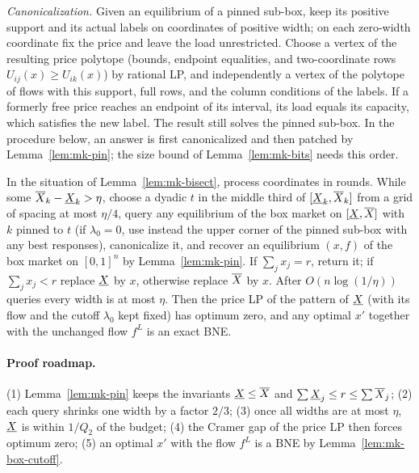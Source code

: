 \emph{Canonicalization.} Given an equilibrium of a pinned sub-box, keep its positive support and its
actual labels on coordinates of positive width; on each zero-width coordinate fix the price and leave
the load unrestricted. Choose a vertex of the resulting price polytope (bounds, endpoint equalities,
and two-coordinate rows $U_{ij}(x)\ge U_{ik}(x)$) by rational LP, and independently a vertex of the
polytope of flows with this support, full rows, and the column conditions of the labels. If a formerly
free price reaches an endpoint of its interval, its load equals its capacity, which satisfies the new
label. The result still solves the pinned sub-box. In the procedure below, an answer is first
canonicalized and then patched by Lemma~\ref{lem:mk-pin}; the size bound of Lemma~\ref{lem:mk-bits}
needs this order.

\begin{lemma}\label{lem:mk-narrow}
In the situation of Lemma~\ref{lem:mk-bisect}, process coordinates in rounds. While some
$\overline{X}_k-\underline{X}_k>\eta$, choose a dyadic $t$ in the middle third of $[\underline{X}_k,\overline{X}_k]$ from a grid of spacing at most
$\eta/4$, query any equilibrium of the box market on $[\underline{X}{},\overline{X}{}]$ with $k$ pinned to $t$ (if $\lambda_0=0$,
use instead the upper corner of the pinned sub-box with any best responses), canonicalize it, and
recover an equilibrium $(x,f)$ of the box market on $[0,1]^n$ by Lemma~\ref{lem:mk-pin}. If
$\sum_jx_j=r$, return it; if $\sum_jx_j<r$ replace $\underline{X}{}$ by $x$, otherwise replace $\overline{X}{}$ by $x$. After
$O(n\log(1/\eta))$ queries every width is at most $\eta$. Then the price LP of the pattern of $\underline{X}{}$ (with
its flow and the cutoff $\lambda_0$ kept fixed) has optimum zero, and any optimal $x'$ together with the
unchanged flow $f^L$ is an exact BNE.
\end{lemma}

\paragraph{Proof roadmap.} (1) Lemma~\ref{lem:mk-pin} keeps the invariants $\underline{X}\le\overline{X}$ and
$\sum\underline{X}_j\le r\le\sum\overline{X}_j$; (2) each query shrinks one width by a factor $2/3$; (3) once all
widths are at most $\eta$, $\underline{X}$ is within $1/Q_2$ of the budget; (4) the Cramer gap of the price LP
then forces optimum zero; (5) an optimal $x'$ with the flow $f^L$ is a BNE by
Lemma~\ref{lem:mk-box-cutoff}.

